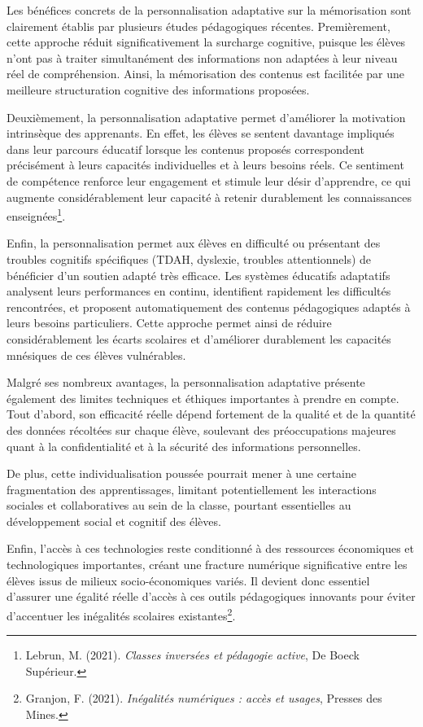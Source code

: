 \documentclass[12pt,a4paper]{report}
\begin{document}
Les bénéfices concrets de la personnalisation adaptative sur la mémorisation sont clairement établis par plusieurs études pédagogiques récentes. Premièrement, cette approche réduit significativement la surcharge cognitive, puisque les élèves n’ont pas à traiter simultanément des informations non adaptées à leur niveau réel de compréhension. Ainsi, la mémorisation des contenus est facilitée par une meilleure structuration cognitive des informations proposées.

Deuxièmement, la personnalisation adaptative permet d’améliorer la motivation intrinsèque des apprenants. En effet, les élèves se sentent davantage impliqués dans leur parcours éducatif lorsque les contenus proposés correspondent précisément à leurs capacités individuelles et à leurs besoins réels. Ce sentiment de compétence renforce leur engagement et stimule leur désir d’apprendre, ce qui augmente considérablement leur capacité à retenir durablement les connaissances enseignées\footnote{Lebrun, M. (2021). \textit{Classes inversées et pédagogie active}, De Boeck Supérieur.}.

Enfin, la personnalisation permet aux élèves en difficulté ou présentant des troubles cognitifs spécifiques (TDAH, dyslexie, troubles attentionnels) de bénéficier d’un soutien adapté très efficace. Les systèmes éducatifs adaptatifs analysent leurs performances en continu, identifient rapidement les difficultés rencontrées, et proposent automatiquement des contenus pédagogiques adaptés à leurs besoins particuliers. Cette approche permet ainsi de réduire considérablement les écarts scolaires et d’améliorer durablement les capacités mnésiques de ces élèves vulnérables.

Malgré ses nombreux avantages, la personnalisation adaptative présente également des limites techniques et éthiques importantes à prendre en compte. Tout d’abord, son efficacité réelle dépend fortement de la qualité et de la quantité des données récoltées sur chaque élève, soulevant des préoccupations majeures quant à la confidentialité et à la sécurité des informations personnelles.

De plus, cette individualisation poussée pourrait mener à une certaine fragmentation des apprentissages, limitant potentiellement les interactions sociales et collaboratives au sein de la classe, pourtant essentielles au développement social et cognitif des élèves.

Enfin, l’accès à ces technologies reste conditionné à des ressources économiques et technologiques importantes, créant une fracture numérique significative entre les élèves issus de milieux socio-économiques variés. Il devient donc essentiel d’assurer une égalité réelle d’accès à ces outils pédagogiques innovants pour éviter d’accentuer les inégalités scolaires existantes\footnote{Granjon, F. (2021). \textit{Inégalités numériques : accès et usages}, Presses des Mines.}.
\end{document}

